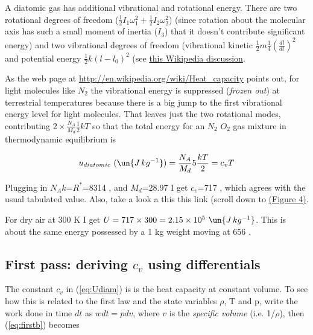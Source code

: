 \documentclass[12pt]{article}
\begin{document}
A diatomic gas has additional vibrational and
rotational energy.  There are two rotational degrees of freedom
($\frac{1}{2} I_1 \omega_1^2 + \frac{1}{2} I_2 \omega_2^2 $) (since
rotation about the molecular axis has such a small moment of inertia
($I_3$) that it doesn't contribute significant energy) and two
vibrational degrees of freedom (vibrational kinetic $\frac{1}{2} m
\frac{1}{4} \left ( \frac{dl}{dt} \right)^2$ and potential energy
$\frac{1}{2}k (l - l_0)^2$ (see
\href{http://en.wikipedia.org/wiki/Equipartition_theorem}%
  {this Wikipedia discussion}. 

As the
  web page at \href{http://en.wikipedia.org/wiki/Heat_capacity}%
  {http://en.wikipedia.org/wiki/Heat\_capacity} points out, for light
  molecules like $N_2$ the vibrational energy is suppressed
  (\textit{frozen out}) at terrestrial temperatures because there is a
  big jump to the first vibrational energy level for light molecules.
  That leaves just the two rotational modes, contributing $2 \times
  \frac{N_A}{M_d} \frac{1 }{2 } k T$ so that the total energy for an 
$N_2$ $O_2$ gas mixture in thermodynamic equilibrium is


\begin{equation}
  \label{eq:Udiam}
  u_{diatomic}\ (\un{J\,kg^{-1}})= \frac{N_A}{M_d} 5 \frac{k T}{2} = c_v T
\end{equation}

 Plugging in
$N_A k$=$R^*$=8314 , and $M_d$=28.97  I get
$c_v$=717 , which agrees with the usual tabulated value.
Also, take a look a this this link (scroll down to
\href{http://en.wikipedia.org/wiki/Equipartition_theorem}%
{(Figure 4)}.

For dry air at 300 K I get $U= 717 \times 300 = 2.15 \times 10^5\ \un{J\,kg^{-1}}$.  This is about
the same energy possessed by a 1 kg weight moving at 656 .


\subsection{First pass:  deriving $c_v$ using differentials}
\label{sec:first-pass:-c_v}

The constant $c_v$ in (\ref{eq:Udiam}) is is the heat capacity at constant volume.  
To see how this is related to the first law and the state variables $\rho$, T and p,
write the work done in time $dt$ as $w dt = p dv$, where
$v$ is the \textit{specific volume} (i.e. 1/$\rho$),  then (\ref{eq:firstb})
becomes
\end{document}
